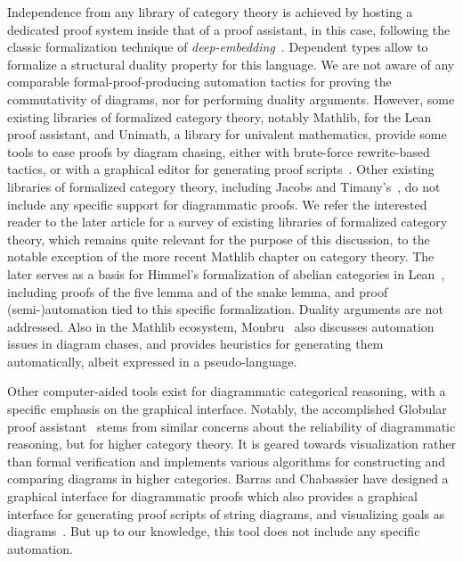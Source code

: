 Independence from any library of category theory is achieved by hosting a dedicated proof system inside that of a proof assistant, \Coq in this case, following the classic formalization technique of \emph{deep-embedding}~\cite{DBLP:conf/tpcd/BoultonGGHHT92}. Dependent types allow to formalize a structural duality property for this language. We are not aware of any comparable formal-proof-producing automation tactics for proving the commutativity of diagrams, nor for performing duality arguments. However, some existing libraries of formalized category theory, notably \textsf{Mathlib}, for the \textsf{Lean} proof assistant, and \textsf{Unimath}, a \Coq{} library for univalent mathematics, provide some tools to ease proofs by diagram chasing, either with brute-force rewrite-based tactics, or with a graphical editor for generating proof scripts~\cite{lafont}. Other existing libraries of formalized category theory, including Jacobs and Timany's~\cite{DBLP:conf/rta/Timany016}, do not include any specific support for diagrammatic proofs. We refer the interested reader to the later article for a survey of existing libraries of formalized category theory, which remains quite relevant for the purpose of this discussion, to the notable exception of the more recent \textsf{Mathlib} chapter on category theory. The later serves as a basis for Himmel's formalization of abelian categories in \textsf{Lean}~\cite{himmel}, including proofs of the five lemma and of the snake lemma, and proof (semi-)automation tied to this specific formalization. Duality arguments are not addressed. Also in the \textsf{Mathlib} ecosystem, Monbru~\cite{monbru} also discusses automation issues in diagram chases, and provides heuristics for generating them automatically, albeit expressed in a pseudo-language.

Other computer-aided tools exist for diagrammatic categorical reasoning, with a specific emphasis on the graphical interface. Notably, the accomplished \textsf{Globular} proof assistant~\cite{DBLP:journals/lmcs/BarKV18} stems from similar concerns about the reliability of diagrammatic reasoning, but for higher category theory. It is  geared towards visualization rather than formal verification and implements various algorithms for constructing and comparing diagrams in higher categories. Barras and Chabassier have designed a graphical interface for diagrammatic proofs which also provides a graphical interface for generating \Coq{} proof scripts of string diagrams, and visualizing \Coq{} goals as diagrams~\cite{barras-chabassier}. But up to our knowledge, this tool does not include any specific automation.

